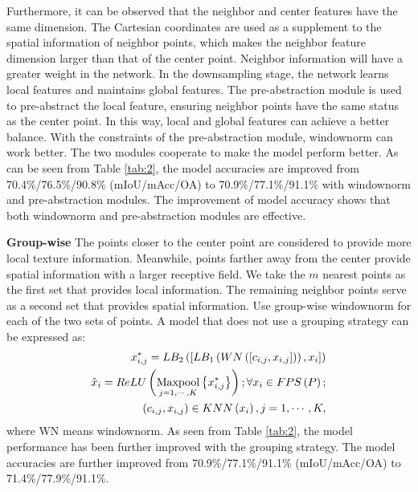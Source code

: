 \documentclass[10pt,twocolumn,letterpaper]{article}
\begin{document}
        Furthermore, it can be observed that the neighbor and center features have the same dimension. The Cartesian coordinates are used as a supplement to the spatial information of neighbor points, which makes the neighbor feature dimension larger than that of the center point. Neighbor information will have a greater weight in the network. In the downsampling stage, the network learns local features and maintains global features. The pre-abstraction module is used to pre-abstract the local feature, ensuring neighbor points have the same status as the center point. In this way, local and global features can achieve a better balance. With the constraints of the pre-abstraction module, windownorm can work better. The two modules cooperate to make the model perform better. As can be seen from Table \ref{tab:2}, the model accuracies are improved from 70.4\%/76.5\%/90.8\% (mIoU/mAcc/OA) to 70.9\%/77.1\%/91.1\% with windownorm and pre-abstraction modules. The improvement of model accuracy shows that both windownorm and pre-abstraction modules are effective.

        \textbf{Group-wise}  The points closer to the center point are considered to provide more local texture information. Meanwhile, points farther away from the center provide spatial information with a larger receptive field. We take the $m$ nearest points as the first set that provides local information. The remaining neighbor points serve as a second set that provides spatial information. Use group-wise windownorm for each of the two sets of points. A model that does not use a grouping strategy can be expressed as:
        \begin{equation}
          \begin{aligned}
      x_{i,j}^{*} = {L{B_2}\left( {\left[ {L{B_1}\left( {WN\left( {\left[ {{c_{i,j}},{x_{i,j}}} \right]} \right)} \right),{x_i}} \right]} \right)}\\
      {\hat x_{i}} = ReLU\left( {\mathop {{\rm{Maxpool}}}\limits_{j = 1, \cdots ,K} \left\{ x_{i,j}^{*} \right\}} \right); \forall {x_i} \in FPS\left( P \right); \\
      {\left( {{c_{i,j}},{x_{i,j}}} \right)} \in KNN\left( {{x_i}} \right),j = 1, \cdots ,K,
          \end{aligned}
      \end{equation}
        where WN means windownorm. As seen from Table \ref{tab:2}, the model performance has been further improved with the grouping strategy. The model accuracies are further improved from 70.9\%/77.1\%/91.1\% (mIoU/mAcc/OA) to 71.4\%/77.9\%/91.1\%.
\end{document}
